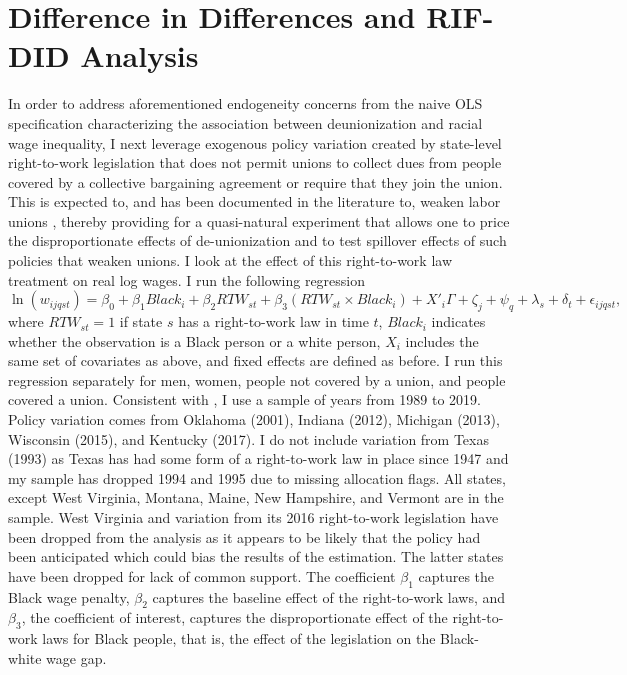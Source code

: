 \documentclass[11pt]{article}
\begin{document}
\section{Difference in Differences and RIF-DID Analysis}\label{sec:did}
In order to address aforementioned endogeneity concerns from the naive OLS specification characterizing the association between deunionization and racial wage inequality, I next leverage exogenous policy variation created by state-level right-to-work legislation that does not permit unions to collect dues from people covered by a collective bargaining agreement or require that they join the union. This is expected to, and has been documented in the literature to, weaken labor unions \citep[see, for example, ][]{taschereau-dumouchel2020}, thereby providing for a quasi-natural experiment that allows one to price the disproportionate effects of de-unionization and to test spillover effects of such policies that weaken unions. I look at the effect of this right-to-work law treatment on real log wages. I run the following regression
\begin{equation}\label{eq:did}
\ln(w_{ijqst}) = \beta_0 + \beta_1Black_i + \beta_2RTW_{st} + \beta_3(RTW_{st}\times Black_i) + X'_i\Gamma +\zeta_j + \psi_q + \lambda_s + \delta_t + \epsilon_{ijqst},  
\end{equation}
where $RTW_{st} = 1$ if state $s$ has a right-to-work law in time $t$, $Black_i$ indicates whether the observation is a Black person or a white person, $X_i$ includes the same set of covariates as above, and fixed effects are defined as before. I run this regression separately for men, women, people not covered by a union, and people covered a union. Consistent with \cite{taschereau-dumouchel2020}, I use a sample of years from 1989 to 2019. Policy variation comes from Oklahoma (2001), Indiana (2012), Michigan (2013), Wisconsin (2015), and Kentucky (2017). I do not include variation from Texas (1993) as Texas has had some form of a right-to-work law in place since 1947 and my sample has dropped 1994 and 1995 due to missing allocation flags. All states, except West Virginia, Montana, Maine, New Hampshire, and Vermont are in the sample. West Virginia and variation from its 2016 right-to-work legislation have been dropped from the analysis as it appears to be likely that the policy had been anticipated which could bias the results of the estimation. The latter states have been dropped for lack of common support. The coefficient $\beta_1$ captures the Black wage penalty, $\beta_2$ captures the baseline effect of the right-to-work laws, and $\beta_3$, the coefficient of interest, captures the disproportionate effect of the right-to-work laws for Black people, that is, the effect of the legislation on the Black-white wage gap.
\end{document}
